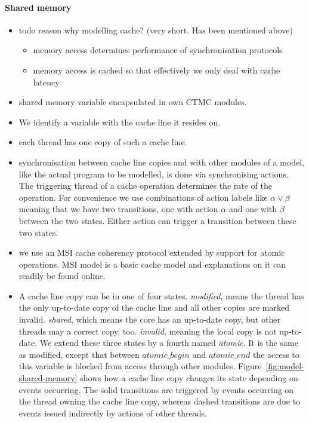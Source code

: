 \documentclass[a4paper, 10pt]{article}
\begin{document}
\paragraph{Shared memory}
\label{sssec:analysis-modelchecking-modelling-shared-memory}
\begin{itemize}
	\item todo reason why modelling cache? (very short. Has been mentioned above)
		\begin{itemize}
			\item memory access determines performance of synchronisation protocols
			\item memory access is cached so that effectively we only deal with cache latency
		\end{itemize}
	\item shared memory variable encapsulated in own CTMC modules.
	\item We identify a variable with the cache line it resides on.
	\item each thread has one copy of such a cache line.
	\item synchronisation between cache line copies and with other modules of a model, like the actual program to be modelled, is done via synchronising actions. The triggering thread of a cache operation determines the rate of the operation. For convenience we use combinations of action labels like $\alpha \lor \beta$ meaning that we have two transitions, one with action $\alpha$ and one with $\beta$ between the two states. Either action can trigger a transition between these two states.
	\item we use an MSI cache coherency protocol extended by support for atomic operations. MSI model is a basic cache model and explanations on it can readily be found online\cite{msi}.
	\item A cache line copy can be in one of four states. \emph{modified}, means the thread has the only up-to-date copy of the cache line and all other copies are marked invalid. \emph{shared}, which means the core has an up-to-date copy, but other threads may a correct copy, too. \emph{invalid}, meaning the local copy is not up-to-date. We extend these three states by a fourth named \emph{atomic}. It is the same as modified, except that between $\mathit{atomic\_begin}$ and $\mathit{atomic\_end}$ the access to this variable is blocked from access through other modules. Figure~\ref{fig:model-shared-memory} shows how a cache line copy changes its state depending on events occurring. The solid transitions are triggered by events occurring on the thread owning the cache line copy, whereas dashed transitions are due to events issued indirectly by actions of other threads.

\end{itemize}
\end{document}
